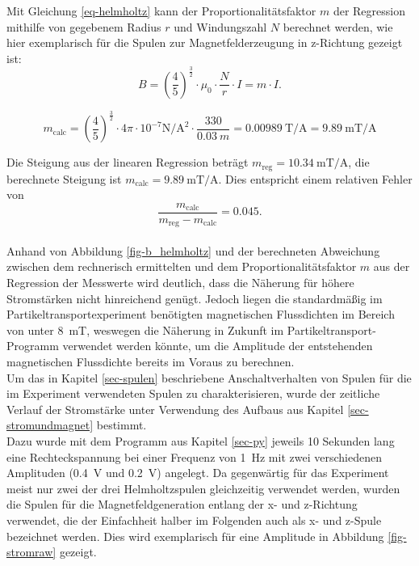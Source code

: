 \documentclass[page,pdftex,12pt,a4paper,twoside,openright]{scrbook}
\begin{document}
Mit Gleichung \ref{eq-helmholtz} kann der Proportionalitätsfaktor \(m\) der Regression mithilfe von gegebenem Radius \(r\) und Windungszahl \(N\) berechnet werden, wie hier exemplarisch für die Spulen zur Magnetfelderzeugung in z-Richtung gezeigt ist:\\

\begin{equation}
B = \left(\frac{4}{5}\right)^{\frac{3}{2}} \cdot \mu_{\mathrm{0}} \cdot \frac{N}{r} \cdot I = m \cdot I.
\end{equation}

\begin{equation}
\label{eq-regression}
m_\mathrm{calc} = \left(\frac{4}{5}\right)^{\frac{3}{2}} \cdot 4\pi \cdot 10^{-7}\si{\newton\per\square\ampere} \cdot \frac{330}{\SI{0.03}{m}} = \SI{0.00989}{\tesla\per\ampere} = \SI{9.89}{\milli\tesla\per\ampere}
\end{equation}

Die Steigung aus der linearen Regression beträgt \(m_\mathrm{reg} = \SI{10.34}{\milli\tesla\per\ampere}\), die berechnete Steigung ist \(m_\mathrm{calc} = \SI{9.89}{\milli\tesla\per\ampere}\). Dies entspricht einem relativen Fehler von $$ \frac{m_\mathrm{calc}}{m_\mathrm{reg} -m_\mathrm{calc}} = 0.045 .$$\\
Anhand von Abbildung \ref{fig-b_helmholtz} und der berechneten Abweichung zwischen dem rechnerisch ermittelten und dem Proportionalitätsfaktor \(m\) aus der Regression der Messwerte wird deutlich, dass die Näherung für höhere Stromstärken nicht hinreichend genügt. Jedoch liegen die standardmäßig im Partikeltransportexperiment benötigten magnetischen Flussdichten im Bereich von unter \SI{8}{\milli\tesla}, weswegen die Näherung in Zukunft im Partikeltransport-Programm verwendet werden könnte, um die Amplitude der entstehenden magnetischen Flussdichte bereits im Voraus zu berechnen.\\

Um das in Kapitel \ref{sec-spulen} beschriebene Anschaltverhalten von Spulen für die im Experiment verwendeten Spulen zu charakterisieren, wurde der zeitliche Verlauf der Stromstärke unter Verwendung des Aufbaus aus Kapitel \ref{sec-stromundmagnet} bestimmt.\\

Dazu wurde mit dem Programm aus Kapitel \ref{sec-py} jeweils 10 Sekunden lang eine Rechteckspannung bei einer Frequenz von \SI{1}{\hertz} mit zwei verschiedenen Amplituden (\SI{0.4}{\volt} und \SI{0.2}{\volt}) angelegt. Da gegenwärtig für das Experiment meist nur zwei der drei Helmholtzspulen gleichzeitig verwendet werden, wurden die Spulen für die Magnetfeldgeneration entlang der x- und z-Richtung verwendet, die der Einfachheit halber im Folgenden auch als x- und z-Spule bezeichnet werden. Dies wird exemplarisch für eine Amplitude in Abbildung \ref{fig-stromraw} gezeigt.\\
\end{document}
